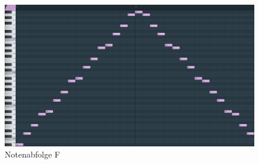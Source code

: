 \begin{figure}[htbp] \centering
	\includegraphics[width=.95\linewidth]{images/Noten_F.png}
	\caption{Notenabfolge F}
	\label{NotenabfolgeF}
\end{figure}